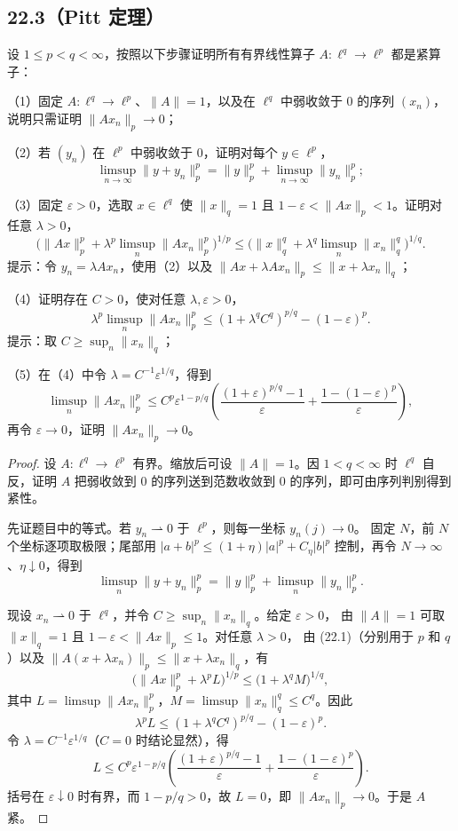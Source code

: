 \subsection*{22.3（Pitt 定理）}
\begin{problem}
设 $1\leq p<q<\infty$，按照以下步骤证明所有有界线性算子
$A:\ell^q\to\ell^p$ 都是紧算子：

（1）固定 $A:\ell^q\to\ell^p$、$\|A\|=1$，以及在 $\ell^q$ 中弱收敛于 $0$ 的序列
$(x_n)$，说明只需证明 $\|Ax_n\|_p\to0$；

（2）若 $(y_n)$ 在 $\ell^p$ 中弱收敛于 $0$，证明对每个 $y\in\ell^p$，
\[
 \limsup_{n\to\infty}\|y+y_n\|_p^p
 =\|y\|_p^p+\limsup_{n\to\infty}\|y_n\|_p^p;
\]

（3）固定 $\varepsilon>0$，选取 $x\in\ell^q$ 使
$\|x\|_q=1$ 且 $1-\varepsilon<\|Ax\|_p<1$。证明对任意 $\lambda>0$，
\[
 \bigl(\|Ax\|_p^p+\lambda^p\limsup_n\|Ax_n\|_p^p\bigr)^{1/p}
 \leq
 \bigl(\|x\|_q^q+\lambda^q\limsup_n\|x_n\|_q^q\bigr)^{1/q}.
\]
提示：令 $y_n=\lambda Ax_n$，使用（2）以及
$\|Ax+\lambda Ax_n\|_p\leq\|x+\lambda x_n\|_q$；

（4）证明存在 $C>0$，使对任意 $\lambda,\varepsilon>0$，
\[
 \lambda^p\limsup_n\|Ax_n\|_p^p
 \leq(1+\lambda^qC^q)^{p/q}-(1-\varepsilon)^p.
\]
提示：取 $C\geq\sup_n\|x_n\|_q$；

（5）在（4）中令 $\lambda=C^{-1}\varepsilon^{1/q}$，得到
\[
 \limsup_n\|Ax_n\|_p^p
 \leq C^p\varepsilon^{1-p/q}
 \left(\frac{(1+\varepsilon)^{p/q}-1}{\varepsilon}
 +\frac{1-(1-\varepsilon)^p}{\varepsilon}\right),
\]
再令 $\varepsilon\to0$，证明 $\|Ax_n\|_p\to0$。
\end{problem}

\begin{proof}
设 $A:\ell^q\to\ell^p$ 有界。缩放后可设 $\|A\|=1$。因 $1<q<\infty$ 时 $\ell^q$
自反，证明 $A$ 把弱收敛到 $0$ 的序列送到范数收敛到 $0$ 的序列，即可由序列判别得到紧性。

先证题目中的等式。若 $y_n\rightharpoonup0$ 于 $\ell^p$，则每一坐标 $y_n(j)\to0$。
固定 $N$，前 $N$ 个坐标逐项取极限；尾部用
$|a+b|^p\leq(1+\eta)|a|^p+C_\eta|b|^p$ 控制，再令 $N\to\infty$、$\eta\downarrow0$，得到
\[
 \limsup_n\|y+y_n\|_p^p=\|y\|_p^p+\limsup_n\|y_n\|_p^p. \tag{22.1}
\]

现设 $x_n\rightharpoonup0$ 于 $\ell^q$，并令 $C\geq\sup_n\|x_n\|_q$。给定 $\varepsilon>0$，
由 $\|A\|=1$ 可取 $\|x\|_q=1$ 且 $1-\varepsilon<\|Ax\|_p\leq1$。对任意 $\lambda>0$，
由 (22.1)（分别用于 $p$ 和 $q$）以及 $\|A(x+\lambda x_n)\|_p\leq\|x+\lambda x_n\|_q$，有
\[
 \bigl(\|Ax\|_p^p+\lambda^pL\bigr)^{1/p}
 \leq\bigl(1+\lambda^qM\bigr)^{1/q},
\]
其中 $L=\limsup\|Ax_n\|_p^p$，$M=\limsup\|x_n\|_q^q\leq C^q$。因此
\[
 \lambda^pL\leq(1+\lambda^qC^q)^{p/q}-(1-\varepsilon)^p.
\]
令 $\lambda=C^{-1}\varepsilon^{1/q}$（$C=0$ 时结论显然），得
\[
 L\leq C^p\varepsilon^{1-p/q}
 \left(\frac{(1+\varepsilon)^{p/q}-1}{\varepsilon}
       +\frac{1-(1-\varepsilon)^p}{\varepsilon}\right).
\]
括号在 $\varepsilon\downarrow0$ 时有界，而 $1-p/q>0$，故 $L=0$，即
$\|Ax_n\|_p\to0$。于是 $A$ 紧。
\end{proof}

